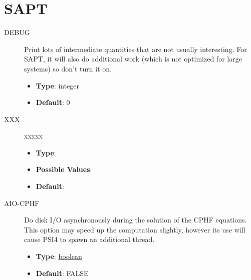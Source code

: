 \documentclass[letterpaper,10pt,english]{sphinxmanual}
\begin{document}
\section{SAPT}
\label{index:sapt}\begin{description}
\item[{DEBUG}] \leavevmode{}\label{index:term-18}
Print lots of intermediate quantities that are not usually interesting.
For SAPT, it will also do additional work (which is not optimized for
large systems) so don't turn it on.
\begin{itemize}
\item {} 
\textbf{Type}: integer

\item {} 
\textbf{Default}: 0

\end{itemize}

\end{description}
\begin{description}
\item[{XXX}] \leavevmode{}\label{index:term-xxx}
xxxxx
\begin{itemize}
\item {} 
\textbf{Type}:

\item {} 
\textbf{Possible Values}:

\item {} 
\textbf{Default}:

\end{itemize}

\end{description}
\begin{description}
\item[{AIO-CPHF}] \leavevmode{}\label{index:term-20}
Do disk I/O asynchronously during the solution of the CPHF equations.
This option may speed up the computation slightly, however its use
will cause PSI4 to spawn an additional thread.
\begin{itemize}
\item {} 
\textbf{Type}: {\hyperref[index:boolean]{boolean}}

\item {} 
\textbf{Default}: FALSE

\end{itemize}

\end{description}
\end{document}
